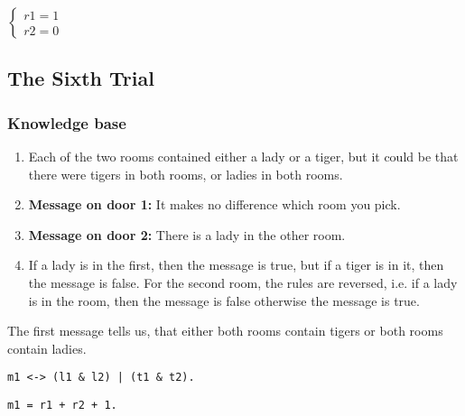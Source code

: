 \begin{center}
\begin{math}
\begin{cases}
 r1 = 1\\
 r2 = 0
\end{cases}
\end{math} 
\end{center}








\subsection{The Sixth Trial}

\subsubsection{Knowledge base}

\begin{enumerate}

\item Each of the two rooms contained either a lady or a tiger, but it could be that there were tigers in both rooms, or ladies in both rooms.

\item \textbf{Message on door 1:} It makes no difference which room you pick.

\item \textbf{Message on door 2:} There is a lady in the other room.


\item If a lady is in the first, then the message is true, but if a tiger is in it, then the message is false. For the second room, the rules are reversed, i.e. if a lady is in the room, then the message is false otherwise the message is true.

\end{enumerate}


The first message tells us, that either both rooms contain tigers or both rooms contain ladies.


\begin{multicols}{2}
\begin{lstlisting}[numbers=none,title=Propositional logic]
m1 <-> (l1 & l2) | (t1 & t2).
\end{lstlisting}

\begin{lstlisting}[numbers=none,title=Modular arithmetics]
m1 = r1 + r2 + 1.
\end{lstlisting}
\end{multicols}

